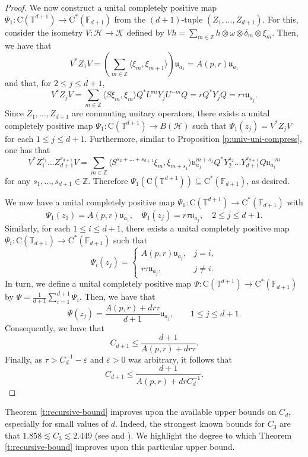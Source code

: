 \documentclass[10pt]{amsart}
\newcommand{\bF}{{\mathbb{F}}}
\newcommand{\bT}{{\mathbb{T}}}
\newcommand{\bZ}{{\mathbb{Z}}}
\renewcommand{\H}{{\mathcal{H}}}
\newcommand{\K}{{\mathcal{K}}}
\newcommand{\rC}{\mathrm{C}}
\begin{document}
\begin{proof}
    We now construct a unital completely positive map $\Psi_1:\rC(\bT^{d+1})\rightarrow \rC^*(\bF_{d+1})$ from the $(d+1)$-tuple $(Z_1,\ldots, Z_{d+1})$. For this, consider the isometry $V:\H\rightarrow\K$ defined by $Vh = \sum_{m\in\bZ} h\otimes\omega\otimes\delta_m\otimes\xi_m$. Then, we have that
    \[
        V^*Z_1V = \left(\sum_{m\in\bZ}\langle\xi_m, \xi_{m+1}\rangle\right)\mathfrak{u}_{a_1} = A(p,r)\mathfrak{u}_{a_1}
    \]
    and that, for $2\leq j\leq d+1$,
    \[
        V^*Z_j V = \sum_{m\in\bZ} \langle S\xi_m, \xi_m\rangle Q^* U^m Y_jU^{-m}Q = rQ^* Y_j Q = r\tau\mathfrak{u}_{a_j}.
    \]
    Since $Z_1,\ldots, Z_{d+1}$ are commuting unitary operators, there exists a unital completely positive map $\Psi_1:\rC(\bT^{d+1})\rightarrow B(\H)$ such that $\Psi_1(z_j) = V^*Z_j V$ for each $1\leq j\leq d+1$. Furthermore, similar to Proposition \ref{p:univ-uni-compress}, one has that
    \[
        V^* Z_1^{s_1}\ldots Z_{d+1}^{s_{d+1}}V = \sum_{m\in\bZ} \langle S^{s_2+\ldots +s_{d+1}}\xi_m, \xi_{m+s_1}\rangle \mathfrak{u}_{a_1}^{m+s_1} Q^* Y_2^{s_2}\ldots Y_{d+1}^{s_{d+1}} Q \mathfrak{u}_{a_1}^{-m}
    \]
    for any $s_1,\ldots, s_{d+1}\in\bZ$. Therefore $\Psi_1(\rC(\bT^{d+1}))\subseteq\rC^*(\bF_{d+1})$, as desired.

    We now have a unital completely positive map $\Psi_1: \rC(\bT^{d+1})\rightarrow\rC^*(\bF_{d+1})$ with
    \[
        \Psi_1(z_1) = A(p,r)\mathfrak{u}_{a_1}, \quad \Psi_1(z_j) = r\tau\mathfrak{u}_{a_j}, \quad 2\leq j\leq d+1.
    \]
    Similarly, for each $1\leq i \leq d+1$, there exists a unital completely positive map $\Psi_i:\rC(\bT_{d+1})\rightarrow\rC^*(\bF_{d+1})$ such that
    \[
        \Psi_i(z_j) = \begin{cases}
            A(p,r)\mathfrak{u}_{a_j}, & j=i,\\
            r\tau\mathfrak{u}_{a_j}, & j\neq i.
        \end{cases}
    \]
    In turn, we define a unital completely positive map $\Psi:\rC(\bT^{d+1})\rightarrow \rC^*(\bF_{d+1})$ by $\Psi = \frac{1}{d+1} \sum_{i=1}^{d+1}\Psi_i$. Then, we have that
    \[
        \Psi(z_j) = \frac{A(p,r) + dr \tau}{d+1}\mathfrak{u}_{a_j}, \qquad 1\leq j\leq d+1.
    \]
    Consequently, we have that
    \[
        C_{d+1} \leq \frac{d+1}{A(p,r) + dr \tau}.
    \]
    Finally, as $\tau>C_d^{-1}-\varepsilon$ and $\varepsilon>0$ was arbitrary, it follows that
    \[
        C_{d+1} \leq \frac{d+1}{A(p,r) + dr C_d^{-1}}.
    \]
\end{proof}

Theorem \ref{t:recursive-bound} improves upon the available upper bounds on $C_d$, especially for small values of $d$. Indeed, the strongest known bounds for $C_3$ are that $1.858\lesssim C_3 \lesssim 2.449$ (see \cite[Corollary 4.7]{gerhold2021dilations} and \cite[Theorem 4.4]{passer2019shape}). We highlight the degree to which Theorem \ref{t:recursive-bound} improves upon this particular upper bound.
\end{document}
